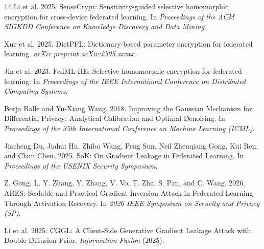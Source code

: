 \documentclass[acmtog,nonacm]{acmart}
\begin{document}
\begin{thebibliography}{14}
Li et al. 2025. SenseCrypt: Sensitivity-guided selective homomorphic encryption for cross-device federated learning. In \emph{Proceedings of the ACM SIGKDD Conference on Knowledge Discovery and Data Mining}.

Xue et al. 2025. DictPFL: Dictionary-based parameter encryption for federated learning. \emph{arXiv preprint arXiv:2505.xxxxx}.

Jin et al. 2023. FedML-HE: Selective homomorphic encryption for federated learning. In \emph{Proceedings of the IEEE International Conference on Distributed Computing Systems}.

Borja Balle and Yu-Xiang Wang. 2018. Improving the Gaussian Mechanism for Differential Privacy: Analytical Calibration and Optimal Denoising. In \emph{Proceedings of the 35th International Conference on Machine Learning (ICML)}.

Jiacheng Du, Jiahui Hu, Zhibo Wang, Peng Sun, Neil Zhenqiang Gong, Kui Ren, and Chun Chen. 2025. SoK: On Gradient Leakage in Federated Learning. In \emph{Proceedings of the USENIX Security Symposium}.

Z. Gong, L. Y. Zhang, Y. Zhang, V. Vo, T. Zhu, S. Pan, and C. Wang. 2026. ARES: Scalable and Practical Gradient Inversion Attack in Federated Learning Through Activation Recovery. In \emph{2026 IEEE Symposium on Security and Privacy (SP)}.

Li et al. 2025. CGGL: A Client-Side Generative Gradient Leakage Attack with Double Diffusion Prior. \emph{Information Fusion} (2025).

\end{thebibliography}
\end{document}

